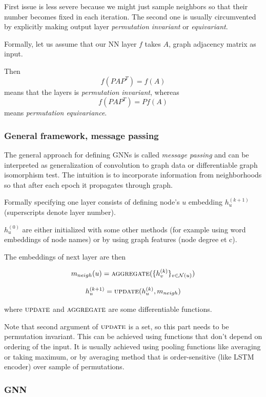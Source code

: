 \documentclass[longabstract,mgr,english]{iithesis}
\begin{document}
First issue is less severe because we might just sample neighbors so that their number becomes fixed in each iteration.
The second one is usually circumvented by explicitly making output layer \emph{permutation invariant} or \emph{equivariant}.

Formally, let us assume that our NN layer \(f\) takes \(A\), graph adjacency matrix as input.

Then $$f(PAP^T) = f(A)$$ means that the layers is \emph{permutation invariant}, whereas  
$$f(PAP^T) = P f(A)$$ means \emph{permutation equivariance}. 

\subsubsection{General framework, message passing}

The general approach for defining GNNs is called \emph{message passing} and can be interpreted as generalization of convolution to graph data or
differentiable graph isomorphism test. The intuition is to incorporate information from neighborhoods so that after each epoch it
propagates through graph.

Formally specifying one layer consists of defining node's \(u\) embedding \(h^{(k+1)}_u\) (superscripts denote layer number).

\(h^{(0)}_u\) are either initialized with some other methods (for example using word embeddings of node names)
or by using graph features (node degree et c).

The embeddings of next layer are then

$$ m_{neigh}(u) = \textsc{aggregate}( \{h^{(k)}_v\}_{v \in \mathcal{N}(u)})$$

$$h^{(k+1)}_u = \textsc{update}(h^{(k)}_u, m_{neigh})$$



where \(\textsc{update}\) and \(\textsc{aggregate}\) are some differentiable functions.

Note that second argument of \(\textsc{update}\) is a set, so this part needs to be permutation invariant.
This can be achieved using functions that don't depend on ordering of the input.
It is usually achieved using pooling functions like averaging or taking maximum, or by averaging method that is order-sensitive (like LSTM encoder) over sample of permutations.

\subsubsection{GNN}
%
\end{document}
